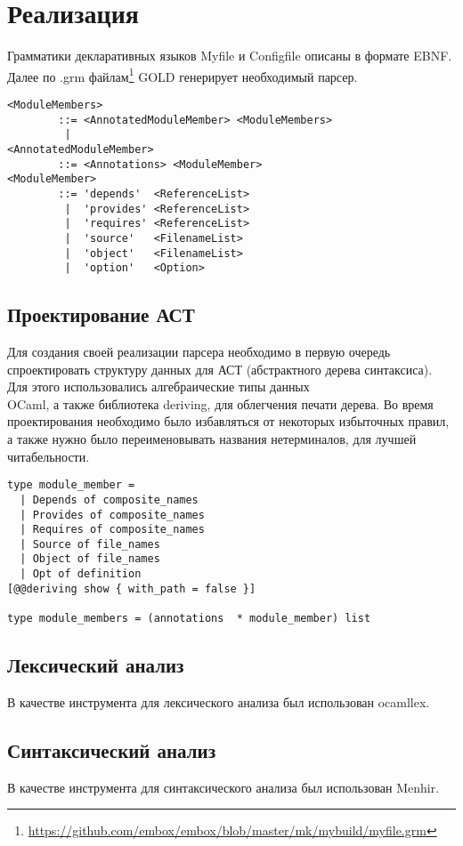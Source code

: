 
\section{Реализация}
Грамматики декларативных языков Myfile и Configfile описаны в формате EBNF. Далее по .grm файлам\footnote{\href{https://github.com/embox/embox/blob/master/mk/mybuild/myfile.grm}{https://github.com/embox/embox/blob/master/mk/mybuild/myfile.grm}} GOLD генерирует необходимый парсер.
\begin{lstlisting}[caption=Пример описания грамматики, frame=single, breaklines]
<ModuleMembers>
        ::= <AnnotatedModuleMember> <ModuleMembers>
         |
<AnnotatedModuleMember>
        ::= <Annotations> <ModuleMember>
<ModuleMember>
        ::= 'depends'  <ReferenceList>
         |  'provides' <ReferenceList>
         |  'requires' <ReferenceList>
         |  'source'   <FilenameList>
         |  'object'   <FilenameList>
         |  'option'   <Option>
\end{lstlisting}
\subsection{Проектирование АСТ}
Для создания своей реализации парсера необходимо в первую очередь спроектировать структуру данных для АСТ (абстрактного дерева синтаксиса). Для этого использовались алгебраические типы данных \\ OCaml, а также библиотека deriving, для облегчения печати дерева. Во время проектирования необходимо было избавляться от некоторых избыточных правил, а также нужно было переименовывать названия нетерминалов, для лучшей читабельности.
\begin{lstlisting}[caption=Пример структуры данных из src/parser/ast.mli, language=caml, frame=single, breaklines]
type module_member =
  | Depends of composite_names
  | Provides of composite_names
  | Requires of composite_names
  | Source of file_names
  | Object of file_names
  | Opt of definition
[@@deriving show { with_path = false }]

type module_members = (annotations  * module_member) list
  \end{lstlisting}
\subsection{Лексический анализ}
В качестве инструмента для лексического анализа был использован ocamllex.
\subsection{Синтаксический анализ}
В качестве инструмента для синтаксического анализа был использован Menhir.

